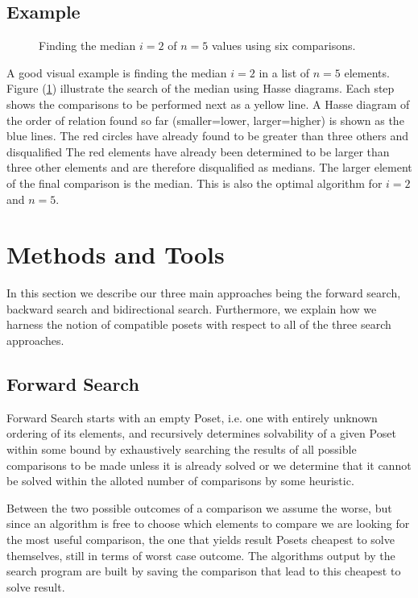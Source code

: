 \documentclass[10pt,journal,compsoc]{IEEEtran}
\begin{document}
\subsection{Example}
\begin{figure}[h!]
  \centering
  
  \caption{Finding the median $i=2$ of $n=5$ values using six comparisons.}
  \label{fig:median_of_5}
\end{figure}
A good visual example is finding the median $i=2$ in a list of $n=5$ elements. Figure
(\ref{fig:median_of_5}) illustrate the search of the median using Hasse diagrams. Each step shows
the comparisons to be performed next as a yellow line. A Hasse diagram of the order of relation
found so far (smaller=lower, larger=higher) is shown as the blue lines. The red circles have already
found to be greater than three others and disqualified The red elements have already been determined
to be larger than three other elements and are therefore disqualified as medians. The larger
element of the final comparison is the median. This is also the optimal algorithm for $i=2$ and
$n=5$.


\section{Methods and Tools}
In this section we describe our three main approaches being the forward search, backward search and bidirectional search. Furthermore, we explain how we harness the notion of compatible posets with respect to all of the three search approaches.

\subsection{Forward Search}\label{chapter:forward_search}
Forward Search starts with an empty Poset, i.e. one with entirely unknown ordering of its elements,
and recursively determines solvability of a given Poset within some bound by exhaustively searching
the results of all possible comparisons to be made unless it is already solved or we determine that
it cannot be solved within the alloted number of comparisons by some heuristic.

Between the two possible outcomes of a comparison we assume the worse, but since an algorithm is
free to choose which elements to compare we are looking for the most useful comparison, the one that
yields result Posets cheapest to solve themselves, still in terms of worst case outcome. The
algorithms output by the search program are built by saving the comparison that lead to this
cheapest to solve result.
\end{document}
